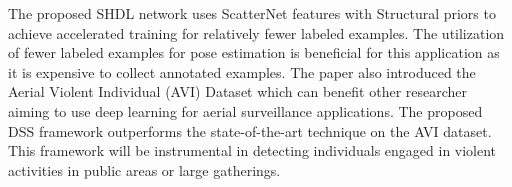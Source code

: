 \documentclass[10pt,twocolumn,letterpaper]{article}
\begin{document}
The proposed SHDL network uses ScatterNet features with Structural priors to achieve accelerated training for relatively fewer labeled examples. The utilization of fewer labeled examples for pose estimation is beneficial for this application as it is expensive to collect annotated examples. The paper also introduced the Aerial Violent Individual (AVI) Dataset which can benefit other researcher aiming to use deep learning for aerial surveillance applications. The proposed DSS framework outperforms the state-of-the-art technique on the AVI dataset. This framework will be instrumental in detecting individuals engaged in violent activities in public areas or large gatherings. 


{\small
	
	
}
\end{document}
